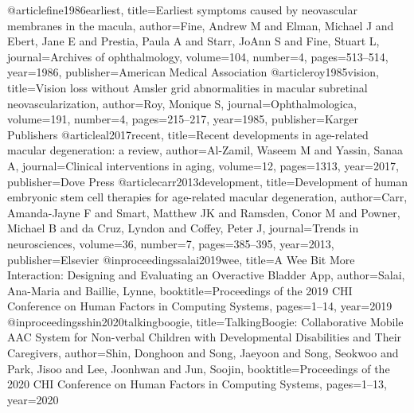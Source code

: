 @article{fine1986earliest,
  title={Earliest symptoms caused by neovascular membranes in the macula},
  author={Fine, Andrew M and Elman, Michael J and Ebert, Jane E and Prestia, Paula A and Starr, JoAnn S and Fine, Stuart L},
  journal={Archives of ophthalmology},
  volume={104},
  number={4},
  pages={513--514},
  year={1986},
  publisher={American Medical Association}
}
@article{roy1985vision,
  title={Vision loss without Amsler grid abnormalities in macular subretinal neovascularization},
  author={Roy, Monique S},
  journal={Ophthalmologica},
  volume={191},
  number={4},
  pages={215--217},
  year={1985},
  publisher={Karger Publishers}
}
@article{al2017recent,
  title={Recent developments in age-related macular degeneration: a review},
  author={Al-Zamil, Waseem M and Yassin, Sanaa A},
  journal={Clinical interventions in aging},
  volume={12},
  pages={1313},
  year={2017},
  publisher={Dove Press}
}
@article{carr2013development,
  title={Development of human embryonic stem cell therapies for age-related macular degeneration},
  author={Carr, Amanda-Jayne F and Smart, Matthew JK and Ramsden, Conor M and Powner, Michael B and da Cruz, Lyndon and Coffey, Peter J},
  journal={Trends in neurosciences},
  volume={36},
  number={7},
  pages={385--395},
  year={2013},
  publisher={Elsevier}
}
@inproceedings{salai2019wee,
  title={A Wee Bit More Interaction: Designing and Evaluating an Overactive Bladder App},
  author={Salai, Ana-Maria and Baillie, Lynne},
  booktitle={Proceedings of the 2019 CHI Conference on Human Factors in Computing Systems},
  pages={1--14},
  year={2019}
}
@inproceedings{shin2020talkingboogie,
  title={TalkingBoogie: Collaborative Mobile AAC System for Non-verbal Children with Developmental Disabilities and Their Caregivers},
  author={Shin, Donghoon and Song, Jaeyoon and Song, Seokwoo and Park, Jisoo and Lee, Joonhwan and Jun, Soojin},
  booktitle={Proceedings of the 2020 CHI Conference on Human Factors in Computing Systems},
  pages={1--13},
  year={2020}
}